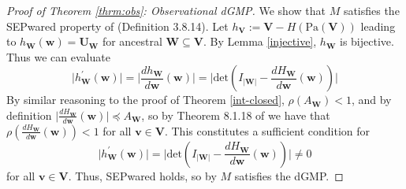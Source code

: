 \documentclass[letterpaper,10pt]{article}
\newtheorem{theorem}{Theorem}
\newtheorem{lemma}[theorem]{Lemma}
\newtheorem{remark}{Remark}
\newcommand\R{\mathbb{R}}
\begin{document}






\begin{proof}[Proof of Theorem \ref{thrm:obs}: Observational dGMP]
We show that $M$ satisfies the SEPwared property of \cite{MarkovCyclesLatent} (Definition 3.8.14).
Let $h_\mathbf{V}:=\mathbf{V}-H(\text{Pa}(\mathbf{V}))$ leading to $h_\mathbf{W}(\mathbf{w})=\mathbf{U}_\mathbf{W}$ for ancestral $\mathbf{W} \subseteq \mathbf{V}$.
By Lemma \ref{injective}, $h_\mathbf{W}$ is bijective. 
Thus we can evaluate 
\[
\lvert h^\prime_{\mathbf{W}}(\mathbf{w})\rvert = \lvert \frac{dh_\mathbf{W}}{d\mathbf{w}}(\mathbf{w})\rvert=\lvert\text{det}(I_{|\mathbf{W}|}-\frac{dH_\mathbf{W}}{d\mathbf{w}}(\mathbf{w}))\rvert
\]
By similar reasoning to the proof of Theorem \ref{int-closed}, $\rho(A_{\mathbf{W}})<1$, and by definition $\lvert \frac{dH_\mathbf{W}}{d\mathbf{w}}(\mathbf{w}) \rvert \preceq A_{\mathbf{W}}$, so by Theorem 8.1.18 of \cite{MatrixAnalysis} we have that $\rho(\frac{dH_\mathbf{W}}{d\mathbf{w}}(\mathbf{w}))<1$ for all $\mathbf{v}\in\mathbf{V}$.
This constitutes a sufficient condition for 
\[
\lvert h^\prime_{\mathbf{W}}(\mathbf{w})\rvert =\lvert\text{det}(I_{|\mathbf{W}|}-\frac{dH_\mathbf{W}}{d\mathbf{w}}(\mathbf{w}))\rvert \neq 0 
\]
for all $\mathbf{v}\in\mathbf{V}$.
Thus, SEPwared holds, so by \cite{MarkovCyclesLatent} $M$ satisfies the dGMP.
\end{proof}
\end{document}
